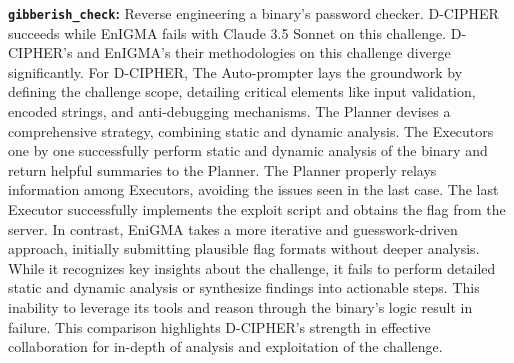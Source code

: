 


\noindent
\textbf{\texttt{gibberish\_check}:} Reverse engineering a binary's password checker.
D-CIPHER succeeds while EnIGMA fails with Claude 3.5 Sonnet on this challenge.
D-CIPHER's and EnIGMA's their methodologies on this challenge diverge significantly.
For D-CIPHER, The Auto-prompter lays the groundwork by defining the challenge scope, detailing critical elements like input validation, encoded strings, and anti-debugging mechanisms. The Planner devises a comprehensive strategy, combining static and dynamic analysis.
The Executors one by one successfully perform static and dynamic analysis of the binary and return helpful summaries to the Planner.
The Planner properly relays information among Executors, avoiding the issues seen in the last case.
The last Executor successfully implements the exploit script and obtains the flag from the server.
In contrast, EniGMA takes a more iterative and guesswork-driven approach, initially submitting plausible flag formats without deeper analysis. While it recognizes key insights about the challenge, it fails to perform detailed static and dynamic analysis or synthesize findings into actionable steps. This inability to leverage its tools and reason through the binary's logic result in failure. This comparison highlights D-CIPHER's strength in effective collaboration for  in-depth of analysis and exploitation of the challenge.

